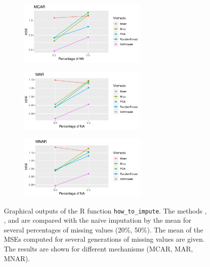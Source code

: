 \begin{appendix}
\begin{figure}
\begin{subfigure}[b]{1\textwidth}
\centering
\includegraphics[width=0.7\textwidth]{figures/MCAR_decathlon.pdf}
\end{subfigure}
%
\begin{subfigure}[b]{1\textwidth}
\centering
\includegraphics[width=0.7\textwidth]{figures/MAR_decathlon.pdf}
\end{subfigure}
%
\begin{subfigure}[b]{1\textwidth}
\centering
\includegraphics[width=0.7\textwidth]{figures/MNAR_decathlon.pdf}
\end{subfigure}
\caption{\label{fig:howtoimpute_R} Graphical outputs of the {R} function \texttt{how\_to\_impute}. The methods , ,  and  are compared with the naive imputation by the mean for several percentages of missing values (20\%, 50\%). The mean of the MSEs computed for several generations of missing values are given. The results are shown for different mechanisms (MCAR, MAR, MNAR).}
\end{figure}



\end{appendix}
